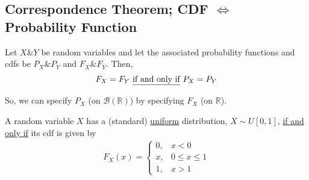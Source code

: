 \documentclass[11pt]{elegantbook}
\begin{document}
\subsection{Correspondence Theorem; CDF $\Leftrightarrow$ Probability Function}
\begin{theorem}
    Let $X\& Y$ be random variables and let the associated probability functions and cdfs be $P_X\& P_Y$ and $F_X\&F_Y$. Then, $$F_X=F_Y \textnormal{ \underline{if and only if} }P_X=P_Y$$
\end{theorem}
So, we can specify $P_X$ (on $\mathcal{B}(\mathbb{R})$) by specifying $F_X$ (on $\mathbb{R}$).

\begin{example}
    A random variable $X$ has a (standard) \underline{uniform} distribution, $X\sim U[0,1]$, \underline{if and only if} its cdf is given by
    \begin{equation}
        \begin{aligned}
            F_X(x)=\left\{\begin{matrix}
                0,&x<0\\
                x,&0\leq x\leq 1\\
                1,&x>1
            \end{matrix}\right.
        \end{aligned}
        \nonumber
    \end{equation}
\end{example}
\end{document}
